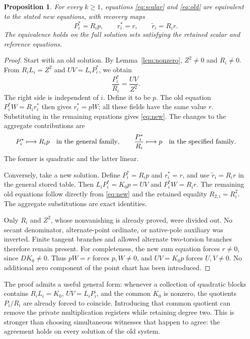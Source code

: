 \documentclass[11pt]{article}
\newtheorem{proposition}[theorem]{Proposition}
\theoremstyle{remark}\newtheorem{remark}[theorem]{Remark}
\begin{document}
\begin{proposition}\label{prop:rechart}
For every \(k\ge1\), equations \eqref{eq:scalar} and
\eqref{eq:old} are equivalent to the stated new equations, with
recovery maps
\[
       P_i^*=R_ip,\qquad r_i^*=r,\qquad
       \widetilde r_i=R_ir.
\]
The equivalence holds on the full solution sets satisfying the
retained scalar and reference equations.
\end{proposition}
\begin{proof}
Start with an old solution. By Lemma~\ref{lem:nonzero},
\(Z^2\ne0\) and \(R_i\ne0\). From \(R_iL_i=Z^2\) and
\(UV=L_iP_i^*\), we obtain
\[
                 \frac{P_i^*}{R_i}=\frac{UV}{Z^2}.
\]
The right side is independent of \(i\). Define it to be \(p\).
The old equation \(P_i^*W=R_i r_i^*\) then gives
\(r_i^*=pW\); all these fields have the same value \(r\).
Substituting in the remaining equations gives \eqref{eq:new}.
The changes to the aggregate contributions are
\[
          P_i^*\longmapsto R_ip\quad\hbox{in the general family},
          \qquad \frac{P_i^*}{R_i}\longmapsto p
             \quad\hbox{in the specified family}.
\]
The former is quadratic and the latter linear.

Conversely, take a new solution. Define \(P_i^*=R_ip\) and
\(r_i^*=r\), and use \(\widetilde r_i=R_ir\) in the general
stored table. Then \(L_iP_i^*=K_0p=UV\) and
\(P_i^*W=R_ir\). The remaining old equations follow directly
from \eqref{eq:new} and the retained equality \(R_{2,i}=R_i^2\).
The aggregate substitutions are exact identities.

Only \(R_i\) and \(Z^2\), whose nonvanishing is already proved,
were divided out. No secant denominator, alternate-point ordinate,
or native-pole auxiliary was inverted. Finite tangent branches and
allowed alternate two-torsion branches therefore remain present.
For completeness, the new sum equation forces \(r\ne0\), since
\(D K_0\ne0\). Thus \(pW=r\) forces \(p,W\ne0\), and
\(UV=K_0p\) forces \(U,V\ne0\). No additional zero component of
the point chart has been introduced.
\end{proof}

The proof admits a useful general form: whenever a collection of
quadratic blocks contains \(R_iL_i=K_0\), \(UV=L_iP_i\), and
the common \(K_0\) is nonzero, the quotients \(P_i/R_i\) are
already forced to coincide. Introducing that common quotient can
remove the private multiplication registers while retaining degree
two. This is stronger than choosing simultaneous witnesses that
happen to agree: the agreement holds on every solution of the old
system.
\end{document}
